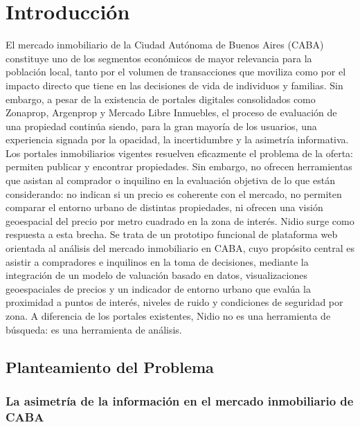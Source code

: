 \chapter{Introducción}

El mercado inmobiliario de la Ciudad Autónoma de Buenos Aires (CABA) constituye uno de los segmentos económicos de mayor relevancia para la población local, tanto por el volumen de transacciones que moviliza como por el impacto directo que tiene en las decisiones de vida de individuos y familias. Sin embargo, a pesar de la existencia de portales digitales consolidados como Zonaprop, Argenprop y Mercado Libre Inmuebles, el proceso de evaluación de una propiedad continúa siendo, para la gran mayoría de los usuarios, una experiencia signada por la opacidad, la incertidumbre y la asimetría informativa. Los portales inmobiliarios vigentes resuelven eficazmente el problema de la oferta: permiten publicar y encontrar propiedades. Sin embargo, no ofrecen herramientas que asistan al comprador o inquilino en la evaluación objetiva de lo que están considerando: no indican si un precio es coherente con el mercado, no permiten comparar el entorno urbano de distintas propiedades, ni ofrecen una visión geoespacial del precio por metro cuadrado en la zona de interés. Nidio surge como respuesta a esta brecha. Se trata de un prototipo funcional de plataforma web orientada al análisis del mercado inmobiliario en CABA, cuyo propósito central es asistir a compradores e inquilinos en la toma de decisiones, mediante la integración de un modelo de valuación basado en datos, visualizaciones geoespaciales de precios y un indicador de entorno urbano que evalúa la proximidad a puntos de interés, niveles de ruido y condiciones de seguridad por zona. A diferencia de los portales existentes, Nidio no es una herramienta de búsqueda: es una herramienta de análisis.

\section{Planteamiento del Problema}

\subsection{La asimetría de la información en el mercado inmobiliario de CABA}

